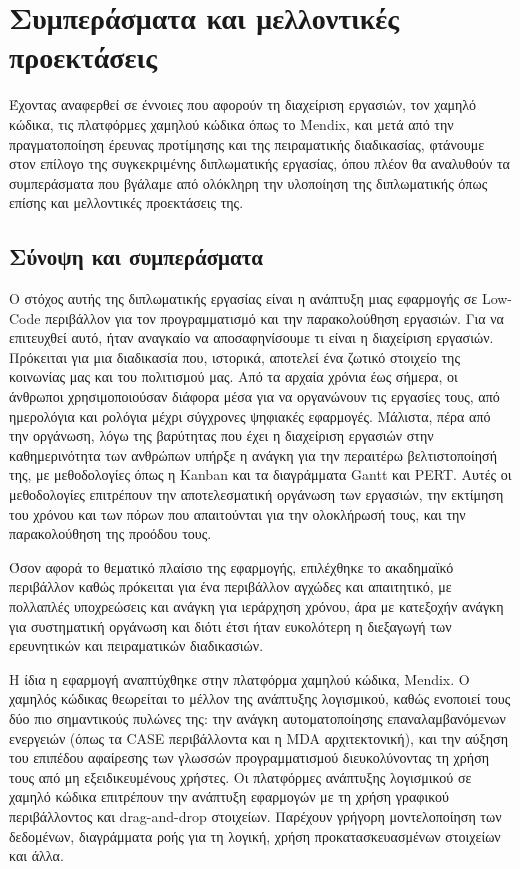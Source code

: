 \chapter{Συμπεράσματα και μελλοντικές προεκτάσεις}
    Έχοντας αναφερθεί σε έννοιες που αφορούν τη διαχείριση εργασιών, τον χαμηλό κώδικα, τις πλατφόρμες χαμηλού κώδικα όπως το Mendix, και μετά από την πραγματοποίηση έρευνας προτίμησης και της πειραματικής διαδικασίας, φτάνουμε στον επίλογο της συγκεκριμένης διπλωματικής εργασίας, όπου πλέον θα αναλυθούν τα συμπεράσματα που βγάλαμε από ολόκληρη την υλοποίηση της διπλωματικής όπως επίσης και μελλοντικές προεκτάσεις της.

    \section{Σύνοψη και συμπεράσματα}
        Ο στόχος αυτής της διπλωματικής εργασίας είναι η ανάπτυξη μιας εφαρμογής σε Low-Code περιβάλλον για τον προγραμματισμό και την παρακολούθηση εργασιών. Για να επιτευχθεί αυτό, ήταν αναγκαίο να αποσαφηνίσουμε τι είναι η διαχείριση εργασιών. Πρόκειται για μια διαδικασία που, ιστορικά, αποτελεί ένα ζωτικό στοιχείο της κοινωνίας μας και του πολιτισμού μας. Από τα αρχαία χρόνια έως σήμερα, οι άνθρωποι χρησιμοποιούσαν διάφορα μέσα για να οργανώνουν τις εργασίες τους, από ημερολόγια και ρολόγια μέχρι σύγχρονες ψηφιακές εφαρμογές. Μάλιστα, πέρα από την οργάνωση, λόγω της βαρύτητας που έχει η διαχείριση εργασιών στην καθημερινότητα των ανθρώπων υπήρξε η ανάγκη για την περαιτέρω βελτιστοποίησή της, με μεθοδολογίες όπως η Kanban και τα διαγράμματα Gantt και PERT. Αυτές οι μεθοδολογίες επιτρέπουν την αποτελεσματική οργάνωση των εργασιών, την εκτίμηση του χρόνου και των πόρων που απαιτούνται για την ολοκλήρωσή τους, και την παρακολούθηση της προόδου τους.

        Όσον αφορά το θεματικό πλαίσιο της εφαρμογής, επιλέχθηκε το ακαδημαϊκό περιβάλλον καθώς πρόκειται για ένα περιβάλλον αγχώδες και απαιτητικό, με πολλαπλές υποχρεώσεις και ανάγκη για ιεράρχηση χρόνου, άρα με κατεξοχήν ανάγκη για συστηματική οργάνωση και διότι έτσι ήταν ευκολότερη η διεξαγωγή των ερευνητικών και πειραματικών διαδικασιών.

        Η ίδια η εφαρμογή αναπτύχθηκε στην πλατφόρμα χαμηλού κώδικα, Mendix. Ο χαμηλός κώδικας θεωρείται το μέλλον της ανάπτυξης λογισμικού, καθώς ενοποιεί τους δύο πιο σημαντικούς πυλώνες της: την ανάγκη αυτοματοποίησης επαναλαμβανόμενων ενεργειών (όπως τα CASE περιβάλλοντα και η MDA αρχιτεκτονική), και την αύξηση του επιπέδου αφαίρεσης των γλωσσών προγραμματισμού διευκολύνοντας τη χρήση τους από μη εξειδικευμένους χρήστες. Οι πλατφόρμες ανάπτυξης λογισμικού σε χαμηλό κώδικα επιτρέπουν την ανάπτυξη εφαρμογών με τη χρήση γραφικού περιβάλλοντος και drag-and-drop στοιχείων. Παρέχουν γρήγορη μοντελοποίηση των δεδομένων, διαγράμματα ροής για τη λογική, χρήση προκατασκευασμένων στοιχείων και άλλα.

